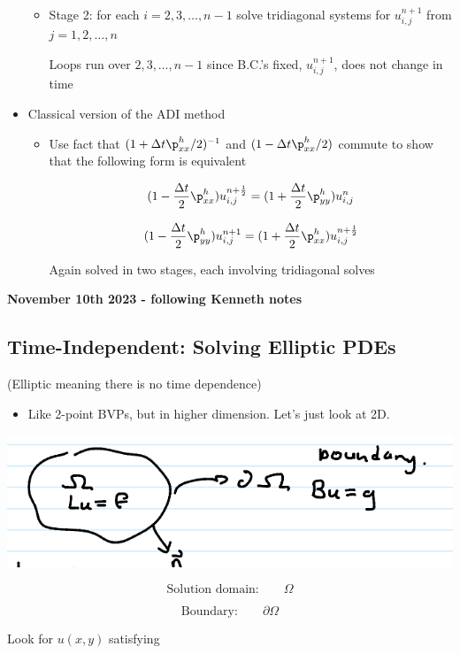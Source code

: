 \begin{itemize}
\begin{itemize}
        \item Stage 2: for each $i =2,3,\ldots,n-1$ solve tridiagonal systems for $u_{i,j}^{n+1}$ from $j=1,2,\ldots, n$

        Loops run over $2,3,\ldots,n-1$ since B.C.'s fixed, $u_{i,j}^{n+1}$, does not change in time
    \end{itemize}

    \item Classical version of the ADI method 

    \begin{itemize}
        \item Use fact that $(1+\Delta t \p_{xx}^h/2)^{-1}$ and $(1-\Delta t \p_{xx}^h/2)$  commute to show that the following form is equivalent

        \[ (1-\frac{\Delta t}{2} \p_{xx}^h ) u_{i,j}^{n+\frac{1}{2}} = (1+\frac{\Delta t}{2} \p_{yy}^h) u_{i,j}^{n}\]

        \[ (1-\frac{\Delta t}{2} \p_{yy}^h ) u_{i,j}^{n+1} = (1+\frac{\Delta t}{2} \p_{xx}^h) u_{i,j}^{n+\frac{1}{2}}\]

        Again solved in two stages, each involving tridiagonal solves
    \end{itemize}
\end{itemize}


\textbf{November 10th 2023 - following Kenneth notes}

\subsection{Time-Independent: Solving Elliptic PDEs}

(Elliptic meaning there is no time dependence)

\begin{itemize}
    \item Like 2-point BVPs, but in higher dimension. Let's just look at 2D.
\end{itemize}


\includegraphics[width = 0.4\linewidth]{Images/elliptic_PDE_setup.png}

\[ \text{Solution domain:} \qquad \Omega\]

\[ \text{Boundary:} \qquad \partial \Omega \]

Look for $u(x,y)$ satisfying

